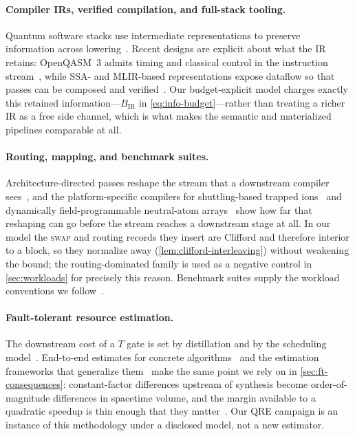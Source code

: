 \documentclass[aps,prx,reprint,floatfix,superscriptaddress]{revtex4-2}
\begin{document}
\paragraph{Compiler IRs, verified compilation, and full-stack tooling.}
Quantum software stacks use intermediate representations to preserve
information across
lowering~\cite{steiger2018projectq,javadi2024qiskit,sivarajah2021tket,martiel2022architecture,watkins2024surfacecode,hietala2021verified,mills2021application,fellous2023optimizing}.
Recent designs are explicit about what the IR retains: OpenQASM~3 admits
timing and classical control in the instruction
stream~\cite{cross2022openqasm}, while SSA- and MLIR-based
representations expose dataflow so that passes can be composed and
verified~\cite{peduri2022qssa,mccaskey2021mlir}.  Our budget-explicit
model charges exactly this retained information---$B_{\mathrm{IR}}$ in
\cref{eq:info-budget}---rather than treating a richer IR as a free side
channel, which is what makes the semantic and materialized pipelines
comparable at all.

\paragraph{Routing, mapping, and benchmark suites.}
Architecture-directed passes reshape the stream that a downstream
compiler
sees~\cite{cowtan2019routing,li2019sabre,martiel2022architecture}, and
the platform-specific compilers for shuttling-based trapped
ions~\cite{kreppel2023shuttling} and dynamically field-programmable
neutral-atom arrays~\cite{tan2024dpqa} show how far that reshaping can
go before the stream reaches a downstream stage at all.  In
our model the \textsc{swap} and routing records they insert are Clifford
and therefore interior to a block, so they normalize away
(\cref{lem:clifford-interleaving}) without weakening the bound; the
routing-dominated family is used as a negative control in
\cref{sec:workloads} for precisely this reason.  Benchmark suites
supply the workload conventions we
follow~\cite{quetschlich2023mqt,tomesh2022supermarq,mills2021application,li2023qasmbench}.

\paragraph{Fault-tolerant resource estimation.}
The downstream cost of a $T$ gate is set by distillation and by the
scheduling
model~\cite{bravyi2005magic,fowler2012surface,horsman2012lattice,litinski2019game,litinski2019magic}.
End-to-end estimates for concrete algorithms~\cite{gidney2021factor} and
the estimation frameworks that generalize
them~\cite{beverland2022assessing,watkins2024surfacecode} make the same
point we rely on in \cref{sec:ft-consequences}: constant-factor
differences upstream of synthesis become order-of-magnitude differences
in spacetime volume, and the margin available to a quadratic speedup is
thin enough that they matter~\cite{babbush2021focus}.  Our QRE campaign
is an instance of this methodology under a disclosed model, not a new
estimator.
\end{document}

